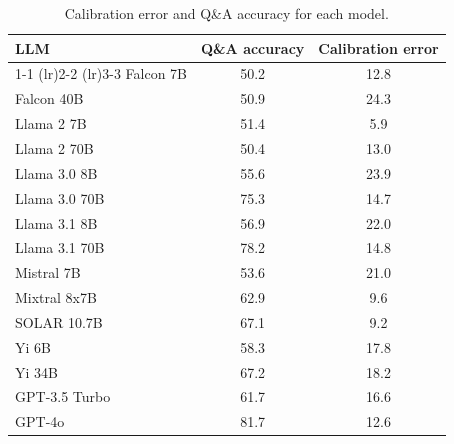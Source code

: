 \begin{table}[h]
\caption{Calibration error and Q\&A accuracy for each model.}
\label{tab:calibration_winogrande_prob_max}
\centering
\begin{tabular}{lcc}
\toprule
LLM & Q\&A accuracy & Calibration error \\ 
\cmidrule(lr){1-1} \cmidrule(lr){2-2} \cmidrule(lr){3-3}
Falcon 7B & 50.2 & 12.8\\
Falcon 40B & 50.9 & 24.3\\
Llama 2 7B & 51.4 & 5.9\\
Llama 2 70B & 50.4 & 13.0\\
Llama 3.0 8B & 55.6 & 23.9\\
Llama 3.0 70B & 75.3 & 14.7\\
Llama 3.1 8B & 56.9 & 22.0\\
Llama 3.1 70B & 78.2 & 14.8\\
Mistral 7B & 53.6 & 21.0\\
Mixtral 8x7B & 62.9 & 9.6\\
SOLAR 10.7B & 67.1 & 9.2\\
Yi 6B & 58.3 & 17.8\\
Yi 34B & 67.2 & 18.2\\
GPT-3.5 Turbo & 61.7 & 16.6\\
GPT-4o & 81.7 & 12.6\\
\bottomrule
\end{tabular}
\end{table}
